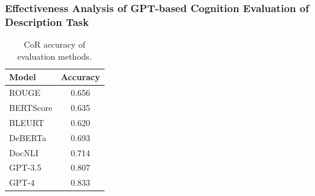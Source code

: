 


\subsubsection{Effectiveness Analysis of GPT-based Cognition Evaluation of Description Task}


\begin{table}[h!]
    \centering
    \small

    \begin{tabular}{lc}
    \hline
    \textbf{Model} & \textbf{Accuracy}\\ %
    \hline
    ROUGE & 0.656 \\
    BERTScore & 0.635 \\
    BLEURT & 0.620 \\
    DeBERTa & 0.693 \\
    DocNLI  & 0.714 \\
    GPT-3.5 & 0.807 \\
    GPT-4 & 0.833 \\
    \hline
    \end{tabular}
    \caption{\label{tab:eval_metrics}
    CoR accuracy of evaluation methods.
    }
\end{table}

